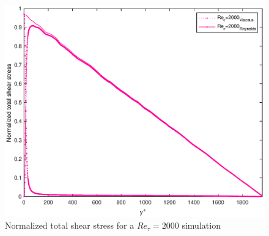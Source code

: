 \begin{figure}
\begin{center}
\includegraphics[scale=0.55]{grafici/stresses_2000.eps}
\caption{Normalized total shear stress for a $Re_{\tau}=2000$ simulation}
\label{stresses:2000}
\end{center} 
\end{figure}
